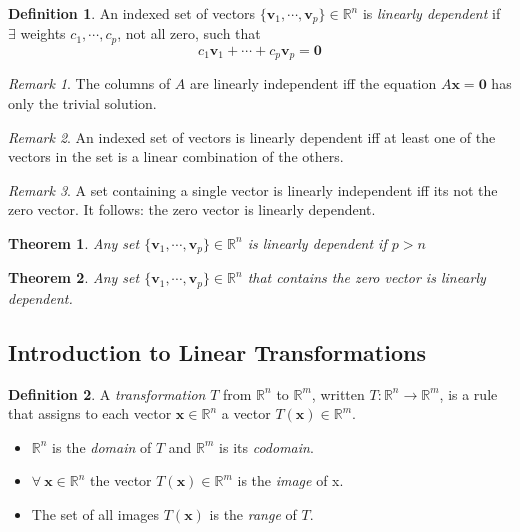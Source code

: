 \documentclass{article}
\renewcommand{\vec}[1]{\textbf{#1}}
\newtheorem{theorem}{Theorem}[section]
\theoremstyle{definition}
\newtheorem{definition}{Definition}[section]
\theoremstyle{remark}
\newtheorem*{remark}{Remark}
\theoremstyle{remark}
\theoremstyle{remark}
\newtheorem*{it follows}{It follows}
\begin{document}
\begin{definition}
  An indexed set of vectors $\{\vec{v}_1, \cdots, \vec{v}_p \} \in \mathbb{R}^n$ is \textit{linearly dependent} if $\exists$ weights $c_1, \cdots, c_p$, not all zero, such that
  $$c_1 \vec{v}_1 + \cdots + c_p \vec{v}_p = \vec{0}$$
\end{definition}

\begin{remark}
  The columns of $A$ are linearly independent iff the equation $A\vec{x} = \vec{0}$ has only the trivial solution.
\end{remark}

\begin{remark}
  An indexed set of vectors is linearly dependent iff at least one of the vectors in the set is a linear combination of the others.
\end{remark}

\begin{remark}
  A set containing a single vector is linearly independent iff its not the zero vector. It follows: the zero vector is linearly dependent.
\end{remark}

\begin{theorem}
  Any set $\{\vec{v}_1, \cdots, \vec{v}_p \} \in \mathbb{R}^n$ is linearly dependent if $p > n$
\end{theorem}

\begin{theorem}
  Any set $\{\vec{v}_1, \cdots, \vec{v}_p \} \in \mathbb{R}^n$ that contains the zero vector is linearly dependent.
\end{theorem}

\subsection{Introduction to Linear Transformations}

\begin{definition}
  A \textit{transformation} $T$ from $\mathbb{R}^n$ to $\mathbb{R}^m$, written $T: \mathbb{R}^n \to \mathbb{R}^m$, is a rule that assigns to each vector $\vec{x} \in \mathbb{R}^n$ a vector $T(\vec{x}) \in \mathbb{R}^m$.
  \begin{itemize}
    \item $\mathbb{R}^n$ is the \textit{domain} of $T$ and $\mathbb{R}^m$ is its \textit{codomain}.
    \item $\forall\ \vec{x} \in \mathbb{R}^n$ the vector $T(\vec{x}) \in \mathbb{R}^m$ is the \textit{image} of x.
    \item The set of all  images $T(\vec{x})$ is the \textit{range} of $T$.
  \end{itemize}
\end{definition}
\end{document}
